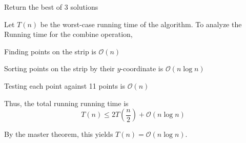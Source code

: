 \begin{listu}
    \item Return the best of 3 solutions
\end{listu}

Let $T(n)$ be the worst-case running time of the algorithm. To analyze the Running time for the combine operation, 
\begin{listu}
    \item Finding points on the strip is $\mathcal{O}(n)$
    \item Sorting points on the strip by their $y$-coordinate is $\mathcal{O}(n \log n)$
    \item Testing each point against 11 points is $\mathcal{O}(n)$
\end{listu}

Thus, the total running running time is \[
    T(n) \le 2T\left( \frac{n}{2} \right) + \mathcal{O}(n \log n)
\] 

By the master theorem, this yields $T(n) = \mathcal{O}(n \log n)$.